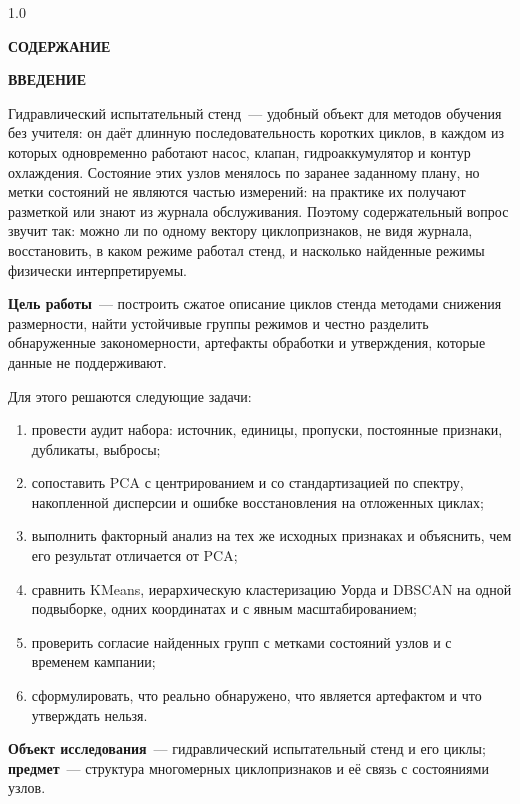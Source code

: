 \documentclass[14pt,a4paper]{extarticle}
\makeatletter
\renewcommand\tableofcontents{%
  \clearpage
  \begin{spacing}{1.0}%
  \begin{center}\bfseries СОДЕРЖАНИЕ\end{center}%
  \@starttoc{toc}%
  \end{spacing}%
}
\newcommand{\struct}[1]{%
  \clearpage
  \begin{center}\bfseries #1\end{center}%
  \addcontentsline{toc}{section}{#1}%
}
\makeatother
\begin{document}
\tableofcontents

\struct{ВВЕДЕНИЕ}

\noindent
Гидравлический испытательный стенд~--- удобный объект для методов обучения
без учителя: он даёт длинную последовательность коротких циклов, в каждом из
которых одновременно работают насос, клапан, гидроаккумулятор и контур
охлаждения. Состояние этих узлов менялось по заранее заданному плану, но
метки состояний не являются частью измерений: на практике их получают
разметкой или знают из журнала обслуживания. Поэтому содержательный вопрос
звучит так: можно ли по одному вектору циклопризнаков, не видя журнала,
восстановить, в каком режиме работал стенд, и насколько найденные режимы
физически интерпретируемы.

\textbf{Цель работы}~--- построить сжатое описание \DataCycles{} циклов
стенда методами снижения размерности, найти устойчивые группы режимов и
честно разделить обнаруженные закономерности, артефакты обработки и
утверждения, которые данные не поддерживают.

Для этого решаются следующие задачи:
\begin{enumerate}
\item провести аудит набора: источник, единицы, пропуски, постоянные
  признаки, дубликаты, выбросы;
\item сопоставить PCA с центрированием и со стандартизацией по спектру,
  накопленной дисперсии и ошибке восстановления на отложенных циклах;
\item выполнить факторный анализ на тех же исходных признаках и объяснить,
  чем его результат отличается от PCA;
\item сравнить KMeans, иерархическую кластеризацию Уорда и DBSCAN на одной
  подвыборке, одних координатах и с явным масштабированием;
\item проверить согласие найденных групп с метками состояний узлов и с
  временем кампании;
\item сформулировать, что реально обнаружено, что является артефактом и что
  утверждать нельзя.
\end{enumerate}

\textbf{Объект исследования}~--- гидравлический испытательный стенд и его
циклы; \textbf{предмет}~--- структура многомерных циклопризнаков и её связь с
состояниями узлов.
\end{document}
